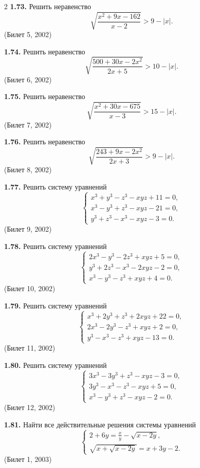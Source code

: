 \documentclass[14pt,a4paper,landscape]{extarticle}
\begin{document}
\begin{multicols}{2}
\textbf{1.73.} Решить неравенство
\[
\sqrt{\frac{x^2 + 9x - 162}{x - 2}} > 9 - |x|.
\]
\hfill \textnormal{(Билет 5, 2002)}

\textbf{1.74.} Решить неравенство
\[
\sqrt{\frac{500 + 30x - 2x^2}{2x + 5}} > 10 - |x|.
\]
\hfill \textnormal{(Билет 6, 2002)}

\textbf{1.75.} Решить неравенство
\[
\sqrt{\frac{x^2 + 30x - 675}{x - 3}} > 15 - |x|.
\]
\hfill \textnormal{(Билет 7, 2002)}

\textbf{1.76.} Решить неравенство
\[
\sqrt{\frac{243 + 9x - 2x^2}{2x + 3}} > 9 - |x|.
\]
\hfill \textnormal{(Билет 8, 2002)}

\textbf{1.77.} Решить систему уравнений
\[
\begin{cases}
x^3 + y^3 - z^3 - xyz + 11 = 0, \\
x^3 - y^3 + z^3 - xyz - 21 = 0, \\
y^3 + z^3 - x^3 - xyz - 3 = 0.
\end{cases}
\]
\hfill \textnormal{(Билет 9, 2002)}

\textbf{1.78.} Решить систему уравнений
\[
\begin{cases}
2x^3 - y^3 - 2z^3 + xyz + 5 = 0, \\
y^3 + 2z^3 - x^3 - 2xyz - 2 = 0, \\
x^3 - y^3 - z^3 + xyz + 4 = 0.
\end{cases}
\]
\hfill \textnormal{(Билет 10, 2002)}

\textbf{1.79.} Решить систему уравнений
\[
\begin{cases}
x^3 + 2y^3 + z^3 + 2xyz + 22 = 0, \\
2x^3 - 2y^3 - z^3 + xyz + 2 = 0, \\
y^3 - x^3 - z^3 + xyz - 13 = 0.
\end{cases}
\]
\hfill \textnormal{(Билет 11, 2002)}

\textbf{1.80.} Решить систему уравнений
\[
\begin{cases}
3x^3 - 3y^3 + z^3 - xyz - 3 = 0, \\
3y^3 - x^3 - z^3 - xyz + 5 = 0, \\
x^3 - y^3 + z^3 - xyz - 2 = 0.
\end{cases}
\]
\hfill \textnormal{(Билет 12, 2002)}

\textbf{1.81.} Найти все действительные решения системы уравнений
\[
\begin{cases}
2 + 6y = \frac{x}{y} - \sqrt{x - 2y}, \\[1ex]
\sqrt{x + \sqrt{x - 2y}} = x + 3y - 2.
\end{cases}
\]
\hfill \textnormal{(Билет 1, 2003)}


\end{multicols}
\end{document}
